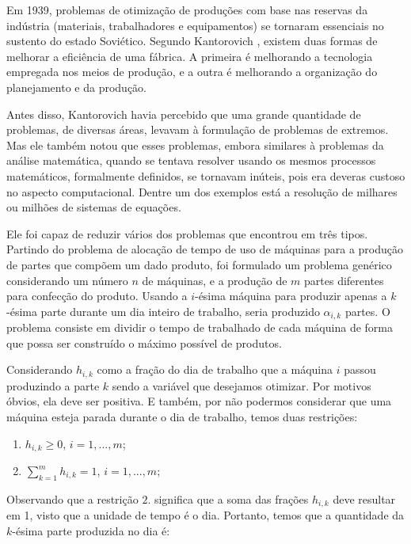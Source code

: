 Em 1939, problemas de otimização de produções com base nas reservas da indústria (materiais,
trabalhadores e equipamentos) se tornaram essenciais no sustento do estado Soviético.
Segundo Kantorovich \cite{kantorovich1939}, existem duas formas de melhorar a eficiência
de uma fábrica. A primeira é melhorando a tecnologia empregada nos meios de produção, e a
outra é melhorando a organização do planejamento e da produção.

Antes disso, Kantorovich havia percebido que uma grande quantidade de problemas, de diversas
áreas, levavam à formulação de problemas de extremos. Mas ele também notou que esses problemas,
embora similares à problemas da análise matemática, quando se tentava resolver
usando os mesmos processos matemáticos, formalmente definidos, se tornavam inúteis, pois era
deveras custoso no aspecto computacional. Dentre um dos exemplos está a resolução de milhares
ou milhões de sistemas de equações.

Ele foi capaz de reduzir vários dos problemas que encontrou em três tipos.
Partindo do problema de alocação de tempo de uso de máquinas para a produção de partes que compõem
um dado produto, foi formulado um problema genérico considerando um número
\(n\) de máquinas, e a produção de \(m\) partes diferentes para confecção do produto. Usando
a \(i\)-ésima máquina para produzir apenas a \(k\)-ésima parte durante um dia inteiro de trabalho,
seria produzido \(\alpha_{i, k}\) partes. O problema consiste em dividir o tempo de trabalhado de cada
máquina de forma que possa ser construído o máximo possível de produtos.


Considerando \(h_{i, k}\) como a fração do dia de trabalho que a máquina \(i\) passou produzindo
a parte \(k\) sendo a variável que desejamos otimizar. Por motivos óbvios, ela deve ser positiva.
E também, por não podermos considerar que uma máquina esteja parada durante o dia de trabalho, temos
duas restrições:

\begin{enumerate}
  \item \(h_{i, k} \geq 0\), \(i =1, ..., m \);
  \item \(\sum_{k=1}^m h_{i, k} = 1\), \(i =1, ..., m \);
  \label{restricoes_a}
\end{enumerate}

Observando que a restrição \(2.\) significa que a soma das frações \(h_{i, k}\) deve resultar
em 1, visto que a unidade de tempo é o dia. Portanto, temos que a quantidade da \(k\)-ésima parte
produzida no dia é:

